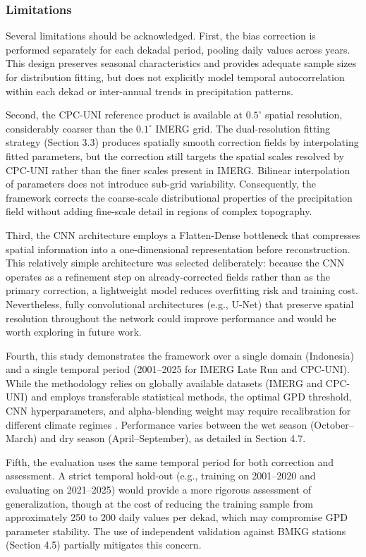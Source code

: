 \documentclass[11pt,a4paper]{article}
\begin{document}
\subsubsection{Limitations}\label{limitations}

Several limitations should be acknowledged. First, the bias correction
is performed separately for each dekadal period, pooling daily values
across years. This design preserves seasonal characteristics and
provides adequate sample sizes for distribution fitting, but does not
explicitly model temporal autocorrelation within each dekad or
inter-annual trends in precipitation patterns.

Second, the CPC-UNI reference product is available at \(0.5^{\circ}\)
spatial resolution, considerably coarser than the \(0.1^{\circ}\) IMERG
grid. The dual-resolution fitting strategy (Section 3.3) produces
spatially smooth correction fields by interpolating fitted parameters,
but the correction still targets the spatial scales resolved by CPC-UNI
rather than the finer scales present in IMERG. Bilinear interpolation of
parameters does not introduce sub-grid variability. Consequently, the
framework corrects the coarse-scale distributional properties of the
precipitation field without adding fine-scale detail in regions of
complex topography.

Third, the CNN architecture employs a Flatten-Dense bottleneck that
compresses spatial information into a one-dimensional representation
before reconstruction. This relatively simple architecture was selected
deliberately: because the CNN operates as a refinement step on
already-corrected fields rather than as the primary correction, a
lightweight model reduces overfitting risk and training cost.
Nevertheless, fully convolutional architectures (e.g., U-Net) that
preserve spatial resolution throughout the network could improve
performance and would be worth exploring in future work.

Fourth, this study demonstrates the framework over a single domain
(Indonesia) and a single temporal period (2001--2025 for IMERG Late Run
and CPC-UNI). While the methodology relies on globally available
datasets (IMERG and CPC-UNI) and employs transferable statistical
methods, the optimal GPD threshold, CNN hyperparameters, and
alpha-blending weight may require recalibration for different climate
regimes \cite{ref44,ref45}. Performance varies between the wet season
(October--March) and dry season (April--September), as detailed in
Section 4.7.

Fifth, the evaluation uses the same temporal period for both correction
and assessment. A strict temporal hold-out (e.g., training on 2001--2020
and evaluating on 2021--2025) would provide a more rigorous assessment
of generalization, though at the cost of reducing the training sample
from approximately 250 to 200 daily values per dekad, which may
compromise GPD parameter stability. The use of independent validation
against BMKG stations (Section 4.5) partially mitigates this concern.
\end{document}
